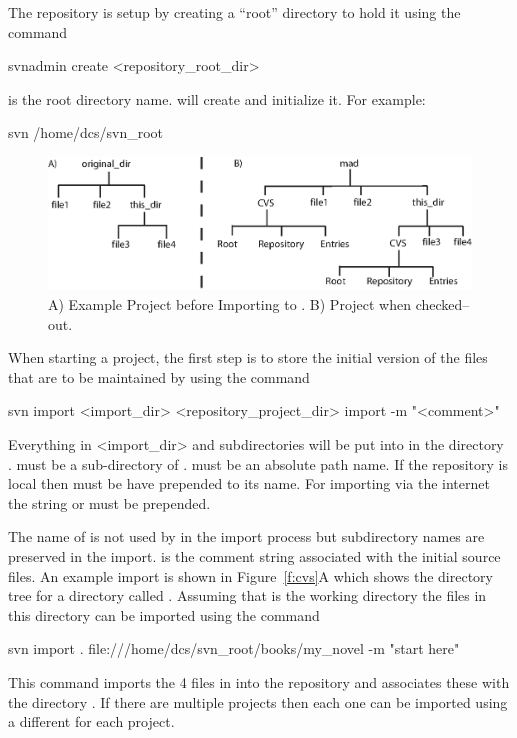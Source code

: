 The \svn repository is setup by creating a ``root'' directory
to hold it using the command
\begin{example}
  svnadmin create <repository_root_dir> 
\end{example}
 is the root directory name. \svn will create
 and initialize it. For example:
\begin{example}
  svn /home/dcs/svn_root
\end{example}

\begin{figure}[tb]
  \begin{centering}
  \includegraphics{svn.eps}
  \caption{A) Example Project before Importing to \svn. B) Project when checked--out.}
  \label{f:svn}
  \end{centering}
\end{figure}

When starting a project, the first step is to store the initial version of the 
files that are to be maintained by \svn using the command
\begin{example}
  svn import <import_dir> <repository_project_dir> import -m "<comment>" 
\end{example}
Everything in <import_dir> and subdirectories will be put into \svn in the
directory .  must
be a sub-directory of .
 must be an absolute path name. If the \svn
repository is local then  must be have
 prepended to its name. For importing via the internet the
string  or  must be prepended.

The name of 
is not used by \svn in the import process but
subdirectory names are preserved in the import.  is the
comment string associated with the initial source
files.  An
example import is shown in Figure~\ref{f:cvs}A which shows the
directory tree for a directory called .  Assuming that
 is the working directory the files in this directory
can be imported using the command
\begin{example}
    svn import . file:///home/dcs/svn_root/books/my_novel -m "start here"
\end{example}
This command imports the 4 files in  into the repository and
associates these with the directory . If there are multiple
projects then each one can be imported using a different  
for each project. 

